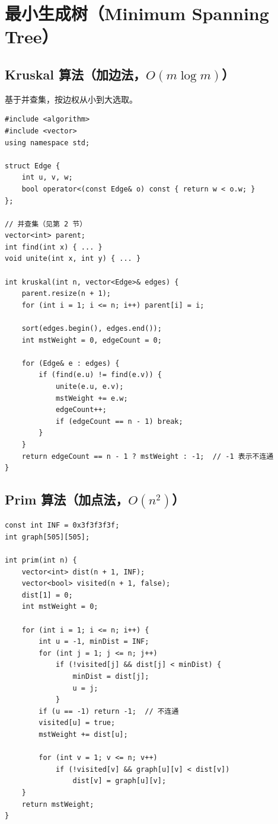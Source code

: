 \documentclass[12pt,a4paper]{article}
\begin{document}
\newpage

\section{最小生成树（Minimum Spanning Tree）}

\subsection{Kruskal 算法（加边法，$O(m\log m)$）}
基于并查集，按边权从小到大选取。

\begin{lstlisting}[caption={Kruskal 算法}]
#include <algorithm>
#include <vector>
using namespace std;

struct Edge {
    int u, v, w;
    bool operator<(const Edge& o) const { return w < o.w; }
};

// 并查集（见第 2 节）
vector<int> parent;
int find(int x) { ... }
void unite(int x, int y) { ... }

int kruskal(int n, vector<Edge>& edges) {
    parent.resize(n + 1);
    for (int i = 1; i <= n; i++) parent[i] = i;

    sort(edges.begin(), edges.end());
    int mstWeight = 0, edgeCount = 0;

    for (Edge& e : edges) {
        if (find(e.u) != find(e.v)) {
            unite(e.u, e.v);
            mstWeight += e.w;
            edgeCount++;
            if (edgeCount == n - 1) break;
        }
    }
    return edgeCount == n - 1 ? mstWeight : -1;  // -1 表示不连通
}
\end{lstlisting}

\subsection{Prim 算法（加点法，$O(n^2)$）}

\begin{lstlisting}[caption={Prim 朴素版}]
const int INF = 0x3f3f3f3f;
int graph[505][505];

int prim(int n) {
    vector<int> dist(n + 1, INF);
    vector<bool> visited(n + 1, false);
    dist[1] = 0;
    int mstWeight = 0;

    for (int i = 1; i <= n; i++) {
        int u = -1, minDist = INF;
        for (int j = 1; j <= n; j++)
            if (!visited[j] && dist[j] < minDist) {
                minDist = dist[j];
                u = j;
            }
        if (u == -1) return -1;  // 不连通
        visited[u] = true;
        mstWeight += dist[u];

        for (int v = 1; v <= n; v++)
            if (!visited[v] && graph[u][v] < dist[v])
                dist[v] = graph[u][v];
    }
    return mstWeight;
}
\end{lstlisting}
\end{document}
